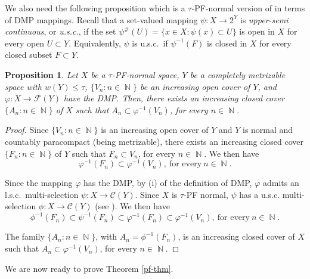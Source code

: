 \documentclass[12pt,a4paper,fleqn,leqno]{amsart}
\theoremstyle{plain}
\newtheorem{proposition}[theorem]{Proposition}
\theoremstyle{definition}
\numberwithin{equation}{section}
\begin{document}
We also need the following proposition which is a $\tau$-PF-normal version of
\cite[Proposition 2.2]{loufouma} in terms of DMP mappings. Recall that a set-valued mapping $\psi:X\to 2^Y$ is \emph{upper-semi continuous}, or \emph{u.s.c.}, if the set $\psi^{\#}(U)= \{x\in X:\psi(x)\subset U\}$ is open in $X$ for every open $U\subset Y$. Equivalently, $\psi$ is u.s.c.\ if $\psi^{-1}(F)$ is closed in $X$ for every closed subset $F\subset Y$.

\begin{proposition}
\label{prop1} Let $X$ be a $\tau$-PF-normal space, $Y$ be a completely metrizable space with $w(Y)\leq\tau$, $\{V_n:n\in\operatorname{\mathbb{N}}\}$ be an increasing open cover of $Y$, and $\varphi:X\to\mathscr{F}(Y)$ have the DMP. Then, there exists an increasing closed cover
$\{A_n:n\in\operatorname{\mathbb{N}}\}$ of $X$ such that $A_n\subset\varphi^{-1}(V_n)$, for every $n\in\operatorname{\mathbb{N}}$.
\end{proposition}

\begin{proof}
Since $\{V_n:n\in\operatorname{\mathbb{N}}\}$ is an increasing open cover of $Y$ and $Y$ is normal and countably paracompact (being metrizable), there exists an increasing closed cover $\{F_n:n\in\operatorname{\mathbb{N}}\}$ of $Y$ such that $F_n\subset V_n$, for every $n\in\operatorname{\mathbb{N}}$. We then have
\[
\varphi^{-1}(F_n)\subset\varphi^{-1}(V_n),\ \text{for every}\ n\in\operatorname{\mathbb{N}}.
\]

Since the mapping $\varphi$ has the DMP, by (i) of the definition of DMP, $\varphi$ admits an l.s.c.\ multi-selection $\psi:X\to\mathscr{C}(Y)$. Since $X$ is $\tau$-PF normal, $\psi$ has a u.s.c. multi-selection $\phi:X\to\mathscr{C}(Y)$ (see \cite[Theorem 4.3]{nedev}). We then have
\[
\phi^{-1}(F_n)\subset\psi^{-1}(F_n)\subset\varphi^{-1}(F_n)\subset\varphi^{-1}(V_n),\ \text{for every}\ n\in\operatorname{\mathbb{N}}.
\]

The family $\{A_n:n\in\operatorname{\mathbb{N}}\}$, with $A_n=\phi^{-1}(F_n)$, is an increasing closed cover of $X$ such that $A_n\subset\varphi^{-1}(V_n)$, for every $n\in\operatorname{\mathbb{N}}$.
\end{proof}

We are now ready to prove Theorem \ref{pf-thm}.
\end{document}
